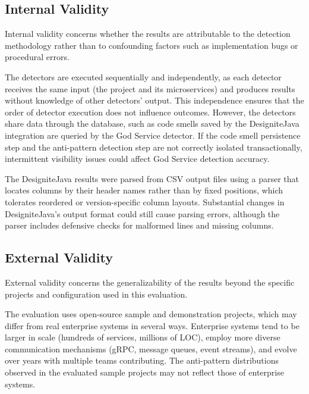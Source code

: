 \subsection{Internal Validity}
\label{subsec:internal-validity}

\par Internal validity concerns whether the results are attributable to the detection methodology rather than to confounding factors such as implementation bugs or procedural errors.

\par The detectors are executed sequentially and independently, as each detector receives the same input (the project and its microservices) and produces results without knowledge of other detectors' output. This independence ensures that the order of detector execution does not influence outcomes. However, the detectors share data through the database, such as code smells saved by the DesigniteJava integration are queried by the God Service detector. If the code smell persistence step and the anti-pattern detection step are not correctly isolated transactionally, intermittent visibility issues could affect God Service detection accuracy.

\par The DesigniteJava results were parsed from CSV output files using a parser that locates columns by their header names rather than by fixed positions, which tolerates reordered or version-specific column layouts. Substantial changes in DesigniteJava's output format could still cause parsing errors, although the parser includes defensive checks for malformed lines and missing columns.

\subsection{External Validity}
\label{subsec:external-validity}

\par External validity concerns the generalizability of the results beyond the specific projects and configuration used in this evaluation.

\par The evaluation uses open-source sample and demonstration projects, which may differ from real enterprise systems in several ways. Enterprise systems tend to be larger in scale (hundreds of services, millions of LOC), employ more diverse communication mechanisms (gRPC, message queues, event streams), and evolve over years with multiple teams contributing. The anti-pattern distributions observed in the evaluated sample projects may not reflect those of enterprise systems.

